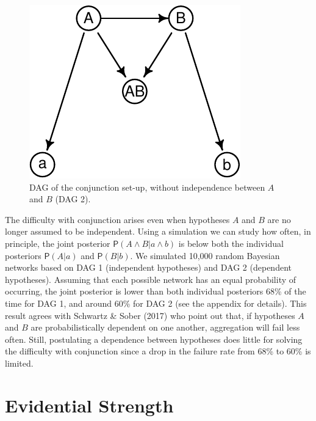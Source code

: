 \documentclass[
  10pt,
  dvipsnames,enabledeprecatedfontcommands]{scrartcl}
\newcommand{\pr}[1]{\ensuremath{\mathsf{P}(#1)}}
\begin{document}
\begin{figure}[h]

\begin{center}\includegraphics[width=0.6\linewidth]{conjunction-paradox4_files/figure-latex/fig:conjunctionDAG2-1} \end{center}
\caption{\textsf{DAG} of the conjunction set-up, without independence between $A$ and $B$ (\textsf{DAG 2}).}
\label{fig:conjunctionDAG2chapter}
\end{figure}

The difficulty with conjunction arises even when hypotheses \(A\) and
\(B\) are no longer assumed to be independent. Using a simulation we can
study how often, in principle, the joint posterior
\(\pr{A\wedge B \vert a \wedge b}\) is below both the individual
posteriors \(\pr{A \vert a}\) and \(\pr{B \vert b}\). We simulated
10,000 random Bayesian networks based on \textsf{DAG 1} (independent
hypotheses) and \textsf{DAG 2} (dependent hypotheses). Assuming that
each possible network has an equal probability of occurring, the joint
posterior is lower than both individual posteriors 68\% of the time for
\textsf{DAG 1}, and around 60\% for \textsf{DAG 2} (see the appendix for
details). This result agrees with Schwartz \& Sober (2017) who point out
that, if hypotheses \(A\) and \(B\) are probabilistically dependent on
one another, aggregation will fail less often. Still, postulating a
dependence between hypotheses does little for solving the difficulty
with conjunction since a drop in the failure rate from 68\% to 60\% is
limited.

\vspace{1mm}
\footnotesize

\normalsize

\hypertarget{evidential-strength}{%
\section{Evidential Strength}\label{evidential-strength}}
\end{document}
